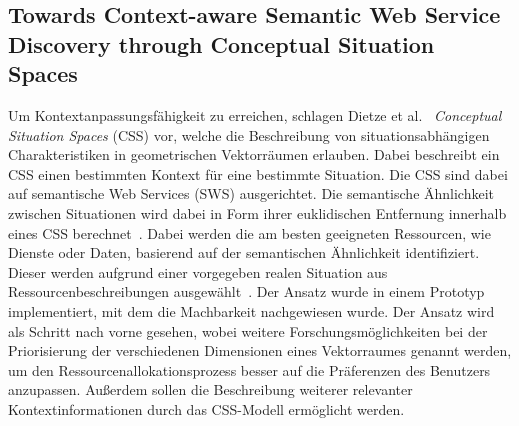 \documentclass[conference,compsoc]{IEEEtran}
\begin{document}
\subsection{Towards Context-aware Semantic Web Service Discovery through Conceptual Situation Spaces}
Um Kontextanpassungsfähigkeit zu erreichen, schlagen Dietze et al.~\cite{dietze2008towards} \textit{Conceptual Situation Spaces} (CSS) vor, welche die Beschreibung von situationsabhängigen Charakteristiken in geometrischen Vektorräumen erlauben. Dabei beschreibt ein CSS einen bestimmten Kontext für eine bestimmte Situation. Die CSS sind dabei auf semantische Web Services (SWS) ausgerichtet. Die semantische Ähnlichkeit zwischen Situationen wird dabei in Form ihrer euklidischen Entfernung innerhalb eines CSS berechnet~\cite{dietze2008towards}. Dabei werden die am besten geeigneten Ressourcen, wie Dienste oder Daten, basierend auf der semantischen Ähnlichkeit identifiziert. Dieser werden aufgrund einer vorgegeben realen Situation aus Ressourcenbeschreibungen ausgewählt~\cite{dietze2008towards}.
Der Ansatz wurde in einem Prototyp implementiert, mit dem die Machbarkeit nachgewiesen wurde.
Der Ansatz wird als Schritt nach vorne gesehen, wobei weitere Forschungsmöglichkeiten bei der Priorisierung der verschiedenen Dimensionen eines Vektorraumes genannt werden, um den Ressourcenallokationsprozess besser auf die Präferenzen des Benutzers anzupassen. Außerdem sollen die Beschreibung weiterer relevanter Kontextinformationen durch das CSS-Modell ermöglicht werden.
\end{document}
